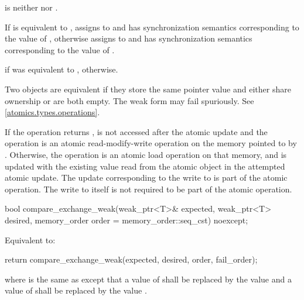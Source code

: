 \begin{itemdescr}
\pnum
\expects
{} is neither
 nor .

\pnum
\effects
If  is equivalent to ,
assigns  to  and
has synchronization semantics corresponding to the value of ,
otherwise assigns  to  and
has synchronization semantics corresponding to the value of .

\pnum
\returns
{} if  was equivalent to ,
 otherwise.

\pnum
\remarks
Two  objects are equivalent if
they store the same pointer value and
either share ownership or are both empty.
The weak form may fail spuriously. See \ref{atomics.types.operations}.

\pnum
If the operation returns ,
 is not accessed after the atomic update and
the operation is an atomic read-modify-write operation
on the memory pointed to by .
Otherwise, the operation is an atomic load operation on that memory, and
 is updated with the existing value
read from the atomic object in the attempted atomic update.
The  update corresponding to the write to 
is part of the atomic operation.
The write to  itself
is not required to be part of the atomic operation.
\end{itemdescr}

%
\begin{itemdecl}
bool compare_exchange_weak(weak_ptr<T>& expected, weak_ptr<T> desired,
                           memory_order order = memory_order::seq_cst) noexcept;
\end{itemdecl}

\begin{itemdescr}
\pnum
\effects
Equivalent to:
\begin{codeblock}
return compare_exchange_weak(expected, desired, order, fail_order);
\end{codeblock}
where  is the same as 
except that a value of 
shall be replaced by the value  and
a value of 
shall be replaced by the value .
\end{itemdescr}


